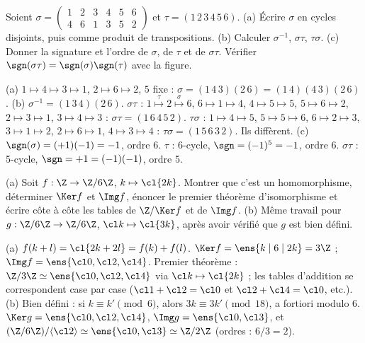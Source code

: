 \begin{exo}
Soient $\sigma=\begin{pmatrix}1&2&3&4&5&6\\4&6&1&3&5&2\end{pmatrix}$ et $\tau=(1\,2\,3\,4\,5\,6)$. (a) Écrire $\sigma$ en cycles disjoints, puis comme produit de transpositions. (b) Calculer $\sigma^{-1}$, $\sigma\tau$, $\tau\sigma$. (c) Donner la signature et l'ordre de $\sigma$, de $\tau$ et de $\sigma\tau$. Vérifier $\sgn(\sigma\tau)=\sgn(\sigma)\sgn(\tau)$ avec la figure.
\begin{corrige}
(a) $1\mapsto4\mapsto3\mapsto1$, $2\mapsto6\mapsto2$, $5$ fixe : $\sigma=(1\,4\,3)(2\,6)=(1\,4)(4\,3)(2\,6)$.
(b) $\sigma^{-1}=(1\,3\,4)(2\,6)$. $\sigma\tau$ : $1\overset\tau\mapsto2\overset\sigma\mapsto6$, $6\mapsto1\mapsto4$, $4\mapsto5\mapsto5$, $5\mapsto6\mapsto2$, $2\mapsto3\mapsto1$, $3\mapsto4\mapsto3$ : $\sigma\tau=(1\,6\,4\,5\,2)$. $\tau\sigma$ : $1\mapsto4\mapsto5$, $5\mapsto5\mapsto6$, $6\mapsto2\mapsto3$, $3\mapsto1\mapsto2$, $2\mapsto6\mapsto1$, $4\mapsto3\mapsto4$ : $\tau\sigma=(1\,5\,6\,3\,2)$. Ils diffèrent.
(c) $\sgn(\sigma)=(+1)(-1)=-1$, ordre $6$. $\tau$ : 6-cycle, $\sgn=(-1)^5=-1$, ordre 6. $\sigma\tau$ : 5-cycle, $\sgn=+1=(-1)(-1)$, ordre 5.
\end{corrige}
\end{exo}
\begin{exo}
(a) Soit $f:\Z\to\Z/6\Z$, $k\mapsto\cl{2k}$. Montrer que c'est un homomorphisme, déterminer $\Ker f$ et $\Img f$, énoncer le premier théorème d'isomorphisme et écrire côte à côte les tables de $\Z/\Ker f$ et de $\Img f$. (b) Même travail pour $g:\Z/6\Z\to\Z/6\Z$, $\cl k\mapsto\cl{3k}$, après avoir vérifié que $g$ est bien défini.
\begin{corrige}
(a) $f(k+l)=\cl{2k+2l}=f(k)+f(l)$. $\Ker f=\ens{k\mid6\mid2k}=3\Z$ ; $\Img f=\ens{\cl0,\cl2,\cl4}$. Premier théorème : $\Z/3\Z\simeq\ens{\cl0,\cl2,\cl4}$ via $\cl k\mapsto\cl{2k}$ ; les tables d'addition se correspondent case par case ($\cl1+\cl2=\cl0$ et $\cl2+\cl4=\cl0$, etc.).
(b) Bien défini : si $k\equiv k'\pmod6$, alors $3k\equiv3k'\pmod{18}$, a fortiori modulo $6$. $\Ker g=\ens{\cl0,\cl2,\cl4}$, $\Img g=\ens{\cl0,\cl3}$, et $(\Z/6\Z)/\langle\cl2\rangle\simeq\ens{\cl0,\cl3}\simeq\Z/2\Z$ (ordres : $6/3=2$).
\end{corrige}
\end{exo}
